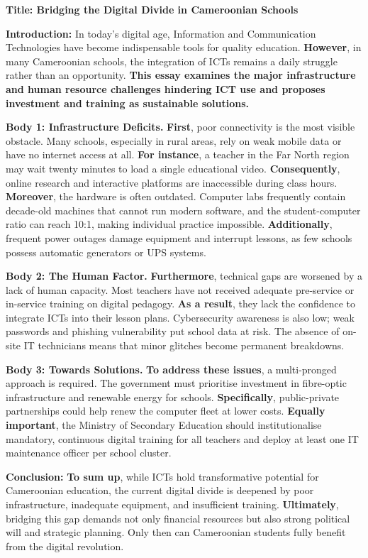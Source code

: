 \documentclass[11pt]{article}
\begin{document}
\begin{exemplebox}
\textbf{Title: Bridging the Digital Divide in Cameroonian Schools}

\textbf{Introduction:} In today's digital age, Information and Communication Technologies have become indispensable tools for quality education. \textbf{However}, in many Cameroonian schools, the integration of ICTs remains a daily struggle rather than an opportunity. \textbf{This essay examines the major infrastructure and human resource challenges hindering ICT use and proposes investment and training as sustainable solutions.}

\textbf{Body 1: Infrastructure Deficits.} \textbf{First}, poor connectivity is the most visible obstacle. Many schools, especially in rural areas, rely on weak mobile data or have no internet access at all. \textbf{For instance}, a teacher in the Far North region may wait twenty minutes to load a single educational video. \textbf{Consequently}, online research and interactive platforms are inaccessible during class hours. \textbf{Moreover}, the hardware is often outdated. Computer labs frequently contain decade-old machines that cannot run modern software, and the student-computer ratio can reach 10:1, making individual practice impossible. \textbf{Additionally}, frequent power outages damage equipment and interrupt lessons, as few schools possess automatic generators or UPS systems.

\textbf{Body 2: The Human Factor.} \textbf{Furthermore}, technical gaps are worsened by a lack of human capacity. Most teachers have not received adequate pre-service or in-service training on digital pedagogy. \textbf{As a result}, they lack the confidence to integrate ICTs into their lesson plans. Cybersecurity awareness is also low; weak passwords and phishing vulnerability put school data at risk. The absence of on-site IT technicians means that minor glitches become permanent breakdowns.

\textbf{Body 3: Towards Solutions.} \textbf{To address these issues}, a multi-pronged approach is required. The government must prioritise investment in fibre-optic infrastructure and renewable energy for schools. \textbf{Specifically}, public-private partnerships could help renew the computer fleet at lower costs. \textbf{Equally important}, the Ministry of Secondary Education should institutionalise mandatory, continuous digital training for all teachers and deploy at least one IT maintenance officer per school cluster.

\textbf{Conclusion:} \textbf{To sum up}, while ICTs hold transformative potential for Cameroonian education, the current digital divide is deepened by poor infrastructure, inadequate equipment, and insufficient training. \textbf{Ultimately}, bridging this gap demands not only financial resources but also strong political will and strategic planning. Only then can Cameroonian students fully benefit from the digital revolution.
\end{exemplebox}
\end{document}
